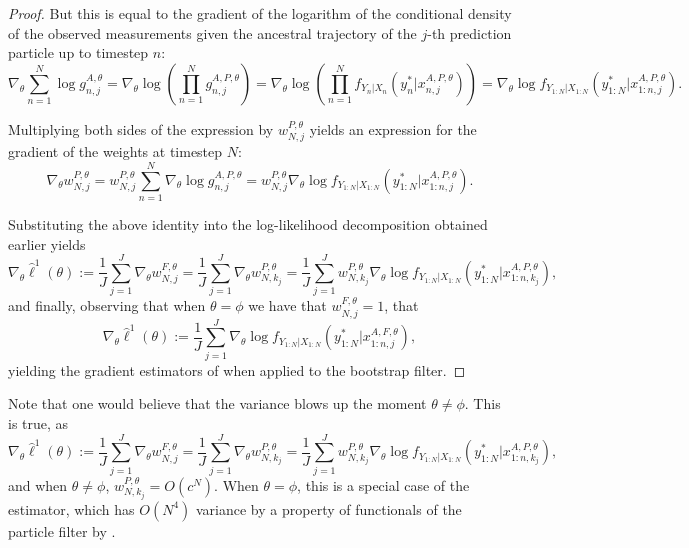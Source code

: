 \begin{proof}
But this is equal to the gradient of the logarithm of the conditional density of the observed measurements given the ancestral trajectory of the $j$-th prediction particle up to timestep $n$:
$$  \nabla_\theta \sum_{n=1}^N \log g_{n,j}^{A,\theta} = \nabla_\theta \log\left(\prod_{n=1}^N g_{n,j}^{A,P,\theta}\right) =  \nabla_\theta \log\left(\prod_{n=1}^N f_{Y_n|X_n}\left(y_n^* | x_{n,j}^{A, P,\theta}\right)\right) = \nabla_\theta \log f_{Y_{1:N}|X_{1:N}}\left(y_{1:N}^* | x_{1:n,j}^{A, P,\theta}\right).$$

Multiplying both sides of the expression by $w_{N,j}^{P,\theta} $ yields an expression for the gradient of the weights at timestep $N$:
$$\nabla_\theta w_{N,j}^{P,\theta} = w_{N,j}^{P,\theta} \sum_{n=1}^N \nabla_\theta \log g_{n,j}^{A,P,\theta} = w_{N,j}^{P,\theta} \nabla_\theta \log f_{Y_{1:N}|X_{1:N}}\left(y_{1:N}^* | x_{1:n,j}^{A, P,\theta}\right).$$

Substituting the above identity into the log-likelihood decomposition obtained earlier yields
\begin{equation*}
    \nabla_\theta \hat{\ell}^1(\theta) := \frac{1}{J}\sum_{j=1}^J \nabla_\theta w_{N,j}^{F,\theta} =\frac{1}{J}\sum_{j=1}^J \nabla_\theta w_{N,k_j}^{P,\theta} = \frac{1}{J}\sum_{j=1}^J w_{N,k_j}^{P,\theta} \nabla_\theta \log f_{Y_{1:N}|X_{1:N}}\left(y_{1:N}^* | x_{1:n,k_j}^{A, P,\theta}\right),
\end{equation*}
and finally, observing that when $\theta=\phi$ we have that $w_{N,j}^{F,\theta}=1$, that 
\begin{equation*}
    \nabla_\theta \hat{\ell}^1(\theta) := \frac{1}{J}\sum_{j=1}^J \nabla_\theta \log f_{Y_{1:N}|X_{1:N}}\left(y_{1:N}^* | x_{1:n,j}^{A, F,\theta}\right),
\end{equation*}
yielding the gradient estimators of \cite{poyiadjis11, scibior21} when applied to the bootstrap filter. 
\end{proof}

Note that one would believe that the variance blows up the moment $\theta\neq\phi$. This is true, as 
\begin{equation*}
    \nabla_\theta \hat{\ell}^1(\theta) := \frac{1}{J}\sum_{j=1}^J \nabla_\theta w_{N,j}^{F,\theta} =\frac{1}{J}\sum_{j=1}^J \nabla_\theta w_{N,k_j}^{P,\theta} = \frac{1}{J}\sum_{j=1}^J w_{N,k_j}^{P,\theta} \nabla_\theta \log f_{Y_{1:N}|X_{1:N}}\left(y_{1:N}^* | x_{1:n,k_j}^{A, P,\theta}\right),
\end{equation*}
and when $\theta\neq\phi$, $w_{N,k_j}^{P,\theta} = O(c^N)$. When $\theta=\phi$, this is a special case of the \cite{poyiadjis11} estimator, which has $O(N^4)$ variance by a property of functionals of the particle filter by \cite{delMoral03}. 

